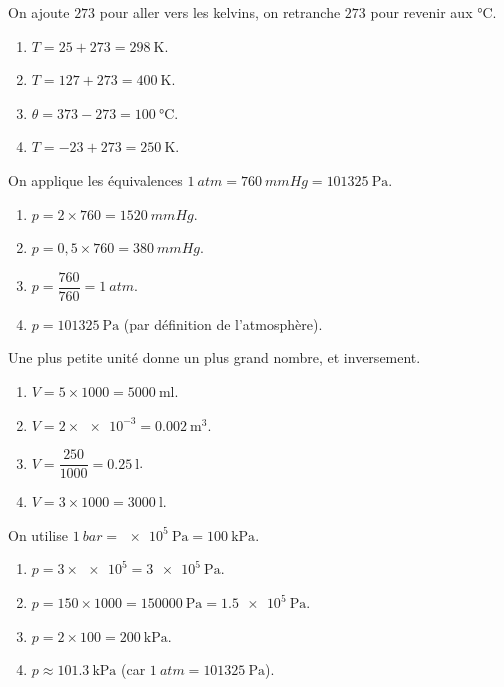 \documentclass[11pt,a4paper]{article}
\begin{document}
\begin{corrige}
On ajoute $273$ pour aller vers les kelvins, on retranche $273$ pour revenir aux \si{\degreeCelsius}.
\begin{enumerate}[label=\alph*)]
  \item $T=25+273=\qty{298}{\kelvin}$.
  \item $T=127+273=\qty{400}{\kelvin}$.
  \item $\theta=373-273=\qty{100}{\degreeCelsius}$.
  \item $T=-23+273=\qty{250}{\kelvin}$.
\end{enumerate}
\end{corrige}

\begin{corrige}
On applique les équivalences $\qty{1}{atm}=\qty{760}{mmHg}=\qty{101325}{\pascal}$.
\begin{enumerate}[label=\alph*)]
  \item $p=2\times760=\qty{1520}{mmHg}$.
  \item $p=0{,}5\times760=\qty{380}{mmHg}$.
  \item $p=\dfrac{760}{760}=\qty{1}{atm}$.
  \item $p=\qty{101325}{\pascal}$ (par définition de l'atmosphère).
\end{enumerate}
\end{corrige}

\begin{corrige}
Une plus petite unité donne un plus grand nombre, et inversement.
\begin{enumerate}[label=\alph*)]
  \item $V=5\times1000=\qty{5000}{\milli\litre}$.
  \item $V=2\times\num{e-3}=\qty{0.002}{\meter\cubed}$.
  \item $V=\dfrac{250}{1000}=\qty{0.25}{\litre}$.
  \item $V=3\times1000=\qty{3000}{\litre}$.
\end{enumerate}
\end{corrige}

\begin{corrige}
On utilise $\qty{1}{bar}=\qty{e5}{\pascal}=\qty{100}{\kilo\pascal}$.
\begin{enumerate}[label=\alph*)]
  \item $p=3\times\num{e5}=\qty{3e5}{\pascal}$.
  \item $p=150\times1000=\qty{150000}{\pascal}=\qty{1.5e5}{\pascal}$.
  \item $p=2\times100=\qty{200}{\kilo\pascal}$.
  \item $p\approx\qty{101.3}{\kilo\pascal}$ (car $\qty{1}{atm}=\qty{101325}{\pascal}$).
\end{enumerate}
\end{corrige}
\end{document}
